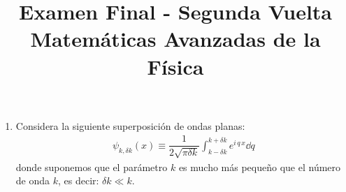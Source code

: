 
\author{}
\title{Examen Final - Segunda Vuelta  \\ \large{Matemáticas Avanzadas de la Física}\vspace{-50pt}}
\date{ }

\renewcommand\labelenumii{\theenumi.{\arabic{enumii})}}
\maketitle
\fontsize{14}{14}\selectfont
\begin{enumerate}
\item Considera la siguiente superposición de ondas planas:
\begin{align*}
\psi_{k, \delta k} (x) \equiv \dfrac{1}{2 \sqrt{\pi \delta k}} \int_{k -\delta k}^{k + \delta k} e^{i \, q \, x} \dd{q}
\end{align*}
donde suponemos que el parámetro $k$ es mucho más pequeño que el número de onda $k$, es decir: $\delta k \ll k$.


\end{enumerate}
